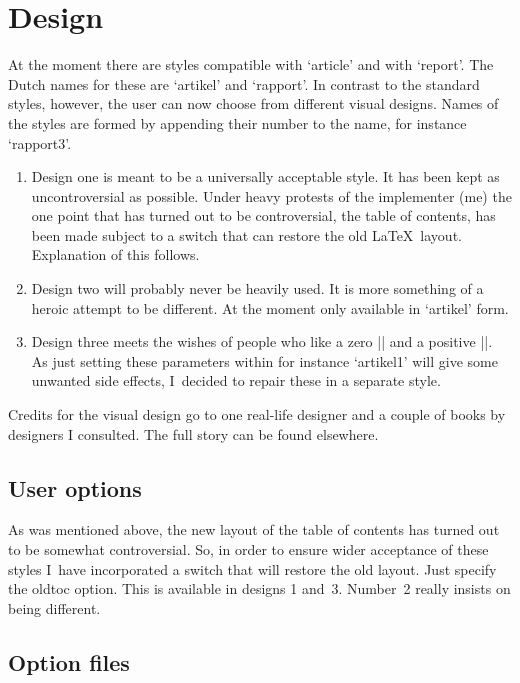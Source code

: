 \documentclass[10pt]{artikel1} %
\newcommand\Lopt[1]{\textsf{#1}}
\begin{document}
\MakeShortVerb{\|}

\section{Design}

At the moment there are styles compatible with `article' and with
`report'. The Dutch names for these are `artikel' and `rapport'. In
contrast to the standard styles, however, the user can now choose from
different visual designs.  Names of the styles are formed by appending
their number to the name, for instance `rapport3'.
\begin{enumerate}
\item Design one is meant to be a universally acceptable style.  It
  has been kept as uncontroversial as possible.  Under heavy protests
  of the implementer (me) the one point that has turned out to be
  controversial, the table of contents, has been made subject to a
  switch that can restore the old \LaTeX\ layout. Explanation of this
  follows.
\item Design two will probably never be heavily used. It is more
  something of a heroic attempt to be different. At the moment only
  available in `artikel' form.
\item Design three meets the wishes of people who like a zero
  |\parindent| and a positive |\parskip|.  As just setting these
  parameters within for instance `artikel1' will give some unwanted
  side effects, I~decided to repair these in a separate style.
\end{enumerate}
Credits for the visual design go to one real-life designer and a
couple of books by designers I consulted.  The full story can be found
elsewhere.

\subsection{User options}

As was mentioned above, the new layout of the table of contents has
turned out to be somewhat controversial.  So, in order to ensure wider
acceptance of these styles I~have incorporated a switch that will
restore the old layout. Just specify the \Lopt{oldtoc} option.  This is
available in designs 1 and~3. Number~2 really insists on being
different.


\subsection{Option files}
\end{document}
